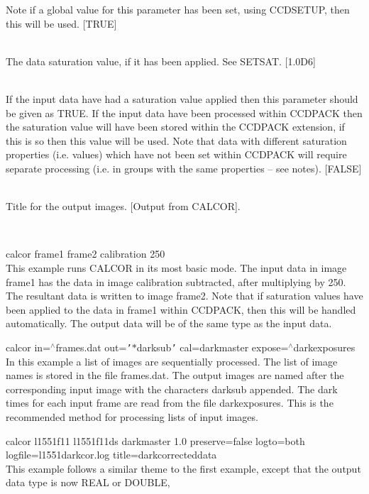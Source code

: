 \documentclass[twoside,11pt]{article}
\newcommand{\htmlref}[2]{#1}
\renewcommand{\_}{\texttt{\symbol{95}}}
\newcommand{\qs}[1]{{\tt '}#1{\tt '}}
\newcommand{\routine}[1]{{\sc #1}}
\newcommand{\xroutine}[1]{\htmlref{{\sc #1}}{#1}}
\newcommand{\sstexamples}[1]{
   \item[Examples:] \mbox{} \\
   \vspace{-3.5ex}
   \begin{description}
      #1
   \end{description}
}
\newcommand{\sstsubsection}[1]{ \item[{#1}] \mbox{} \\}
\newcommand{\sstexamplesubsection}[2]{\sloppy \item{\ssttt #1} \mbox{} \\ #2 }
\newcommand{\sstexamples}[1]{
      \item[Examples:] \\
      \begin{description}
         #1
      \end{description}
      \\
   }
\newcommand{\sstsubsection}[1]{\item[{#1}]}
\newcommand{\sstexamplesubsection}[2]{\item[{\ssttt #1}] #2}
\begin{document}
{{{         Note if a global value for this parameter has been set, using
         \xroutine{CCDSETUP}, then this will be used.
         [TRUE]
      }
      \sstsubsection{
         SATURATION = \_DOUBLE (Read)
      } {
         The data saturation value, if it has been applied. See SETSAT.
         [1.0D6]
      }
      \sstsubsection{
         SETSAT = \_LOGICAL (Read)
      } {
         If the input data have had a saturation value applied then
         this parameter should be given as TRUE. If the input data
         have been processed within CCDPACK then the saturation value
         will have been stored within the CCDPACK extension, if this
         is so then this value will be used. Note that data with
         different saturation properties (i.e. values) which have not
         been set within CCDPACK will require separate processing
         (i.e. in groups with the same properties -- see notes).
         [FALSE]
      }
      \sstsubsection{
         TITLE = LITERAL (Read)
      } {
         Title for the output images.
         [Output from CALCOR].
      }
   }
   \sstexamples{
      \sstexamplesubsection{
         calcor frame1 frame2 calibration 250
      } {
         This example runs \routine{CALCOR} in its most basic mode. The input data
         in image frame1 has the data in image calibration subtracted, after
         multiplying by 250. The resultant data is written to image
         frame2. Note that if saturation values have been applied to the
         data in frame1 within CCDPACK, then this will be handled
         automatically. The output data will be of the same type as the
         input data.
      }
      \sstexamplesubsection{
         calcor in=$^\wedge$frames.dat out=\qs{$*$\_darksub} cal=dark\_master
                expose=$^\wedge$dark\_exposures
      } {
         In this example a list of images are sequentially processed. The
         list of image names is stored in the file frames.dat. The output
         images are named after the corresponding input image with the
         characters \_darksub appended. The dark times for each input
         frame are read from the file dark\_exposures. This is the
         recommended method for processing lists of input images.
      }
      \sstexamplesubsection{
         calcor l1551\_f11 l1551\_f11\_ds dark\_master 1.0 preserve=false
             logto=both logfile=l1551\_darkcor.log
             title=dark\_corrected\_data
      } {
         This example follows a similar theme to the first example,
         except that the output data type is now \_REAL or \_DOUBLE,
}}}
\end{document}
